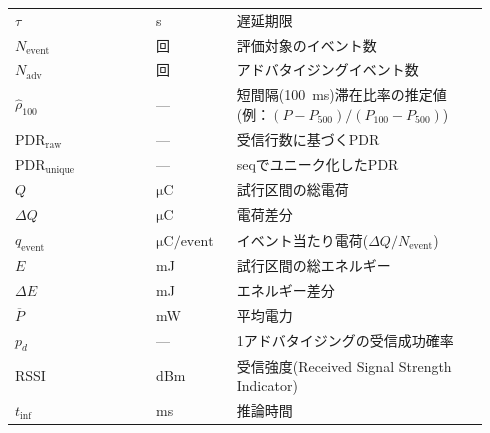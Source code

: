 \begin{longtable}{p{0.28\linewidth}p{0.16\linewidth}p{0.50\linewidth}}
  $\tau$ & s & 遅延期限 \\
  $N_{\mathrm{event}}$ & 回 & 評価対象のイベント数 \\
  $N_{\mathrm{adv}}$ & 回 & アドバタイジングイベント数 \\
  $\hat{\rho}_{100}$ & --- & 短間隔(\SI{100}{\milli\second})滞在比率の推定値(例：$(P-P_{500})/(P_{100}-P_{500})$) \\
  $\mathrm{PDR}_{\mathrm{raw}}$ & --- & 受信行数に基づくPDR \\
  $\mathrm{PDR}_{\mathrm{unique}}$ & --- & seqでユニーク化したPDR \\
  $Q$ & $\si{\micro\coulomb}$ & 試行区間の総電荷 \\
  $\Delta Q$ & $\si{\micro\coulomb}$ & 電荷差分 \\
  $q_{\mathrm{event}}$ & $\si{\micro\coulomb}/\text{event}$ & イベント当たり電荷($\Delta Q/N_{\mathrm{event}}$) \\
  $E$ & mJ & 試行区間の総エネルギー \\
  $\Delta E$ & mJ & エネルギー差分 \\
  $\overline{P}$ & mW & 平均電力 \\
  $p_d$ & --- & 1アドバタイジングの受信成功確率 \\
  RSSI & dBm & 受信強度(Received Signal Strength Indicator) \\
  $t_{\mathrm{inf}}$ & ms & 推論時間 \\
  \bottomrule
\end{longtable}

